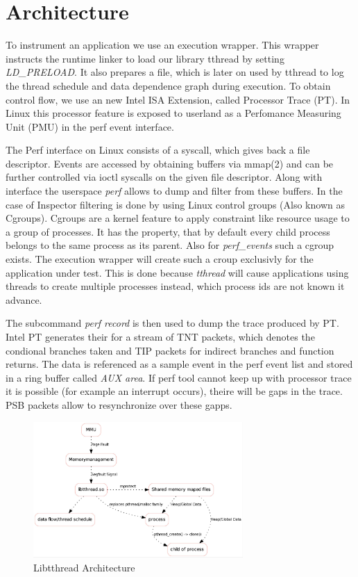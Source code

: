 \section{Architecture}
\label{sec:introduction}

To instrument an application we use an execution wrapper. This wrapper instructs
the runtime linker to load our library tthread by setting \emph{LD\_PRELOAD}. It
also prepares a file, which is later on used by tthread to log the thread
schedule and data dependence graph during execution. To obtain control flow,
we use an new Intel ISA Extension, called Processor Trace (PT).
In Linux this processor feature is exposed to userland as a Perfomance Measuring
Unit (PMU) in the perf event interface.

The Perf interface on Linux consists of a syscall, which gives back a file
descriptor. Events are accessed by obtaining buffers via mmap(2) and can be
further controlled via ioctl syscalls on the given file descriptor. Along with
interface the userspace \emph{perf} allows to dump and filter from these
buffers. In the case of Inspector filtering is done by using Linux control
groups (Also known as Cgroups). Cgroups are a kernel feature to apply constraint
like resource usage to a group of processes. It has the property, that by
default every child process belongs to the same process as its parent. Also for
\emph{perf\_events} such a cgroup exists. The execution wrapper will create such
a croup exclusivly for the application under test. This is done because
\emph{tthread} will cause applications using threads to create multiple
processes instead, which process ids are not known it advance.

The subcommand \emph{perf record} is then used to dump the trace produced by PT.
Intel PT generates their for a stream of TNT packets, which denotes the
condional branches taken and TIP packets for indirect branches and function
returns. The data is referenced as a sample event in the perf event list and
stored in a ring buffer called \emph{AUX area}. If perf tool cannot
keep up with processor trace it is possible (for example an interrupt occurs),
theire will be gaps in the trace. PSB packets allow to resynchronize over these
gapps.

\begin{figure}[h]
\includegraphics[width=8cm]{figure/arch.jpg}
\caption{Libtthread Architecture}
\label{fig:tthread}
\end{figure}

